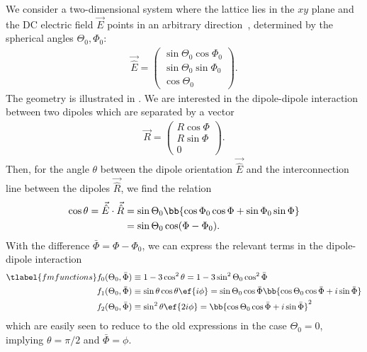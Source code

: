 \noindent
We consider a two-dimensional system where the lattice lies in the $xy$ plane and the DC electric field $\vec{E}$ points in an arbitrary direction~\cite{Gorshkov2011c}, determined by the spherical angles $\Theta_0, \Phi_0$:
\begin{align}
    \vec{\hat{E}}=\begin{pmatrix}
        \sin\Theta_0\cos\Phi_0 \\
        \sin\Theta_0\sin\Phi_0 \\
        \cos\Theta_0
    \end{pmatrix}.
\end{align}
The geometry is illustrated in .
We are interested in the dipole-dipole interaction between two dipoles which are separated
by a vector
\begin{align}
    \vec{R}=\begin{pmatrix}R\cos\Phi \\ R\sin\Phi \\ 0\end{pmatrix}.
\end{align}
Then, for the angle $\theta$ between the dipole orientation $\vec{\hat{E}}$ and the interconnection line between the dipoles $\vec{\hat{R}}$, we find the relation
\begin{align}
    \cos\theta = \vec{\hat{E}} \cdot \vec{\hat{R}} &= \sin\Theta_0\bb{\cos\Phi_0\cos\Phi+\sin\Phi_0\sin\Phi}\\
&=\sin\Theta_0\cos(\Phi-\Phi_0).
\end{align}
With the difference $\bar\Phi=\Phi-\Phi_0$, we can express the relevant terms in the dipole-dipole interaction
\begin{align} \tlabel{fmfunctions}
    f_0(\Theta_0, \bar \Phi)&\equiv 1-3\cos^2\theta = 1-3\sin^2\Theta_0\cos^2\bar\Phi  \\
    f_1(\Theta_0, \bar \Phi)&\equiv \sin\theta\cos\theta \ef{i\phi} = \sin\Theta_0 \cos\bar\Phi \bb{\cos\Theta_0 \cos\bar\Phi + i \sin \bar\Phi}\\
    f_2(\Theta_0, \bar \Phi)&\equiv\sin^2\theta \ef{2i\phi} = \bb{\cos\Theta_0 \cos\bar\Phi + i \sin \bar\Phi}^2
\end{align}
which are easily seen to reduce to the old expressions in the case $\Theta_0=0$,
implying $\theta=\pi/2$ and $\bar\Phi=\phi$.

